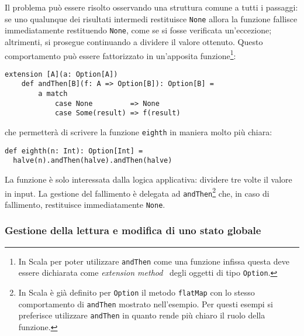 Il problema può essere risolto osservando una struttura comune a tutti i passaggi: se uno qualunque dei risultati intermedi restituisce \lstinline{None} allora la funzione fallisce immediatamente restituendo \lstinline{None}, come se si fosse verificata un'eccezione; altrimenti, si prosegue continuando a dividere il valore ottenuto.
Questo comportamento può essere fattorizzato in un'apposita funzione\footnote{In Scala per poter utilizzare \lstinline{andThen} come una funzione infissa questa deve essere dichiarata come \emph{extension method}~\cite{cit:scala-extension-methods} degli oggetti di tipo \lstinline{Option}.}:
\begin{lstlisting}[language=scala3]
extension [A](a: Option[A])
	def andThen[B](f: A => Option[B]): Option[B] =
		a match
			case None         => None
			case Some(result) => f(result)
\end{lstlisting}
che permetterà di scrivere la funzione \lstinline{eighth} in maniera molto più chiara:
\begin{lstlisting}[language=scala3]
def eighth(n: Int): Option[Int] =
  halve(n).andThen(halve).andThen(halve)
\end{lstlisting}
La funzione è solo interessata dalla logica applicativa: dividere tre volte il valore in input. La gestione del fallimento è delegata ad \lstinline{andThen}\footnote{In Scala è già definito per \lstinline{Option} il metodo \lstinline{flatMap} con lo stesso comportamento di \lstinline{andThen} mostrato nell'esempio. Per questi esempi si preferisce utilizzare \lstinline{andThen} in quanto rende più chiaro il ruolo della funzione.} che, in caso di fallimento, restituisce immediatamente \lstinline{None}.


\subsubsection{Gestione della lettura e modifica di uno stato globale}
\label{gestione-della-lettura-e-modifica-di-uno-stato-globale}

